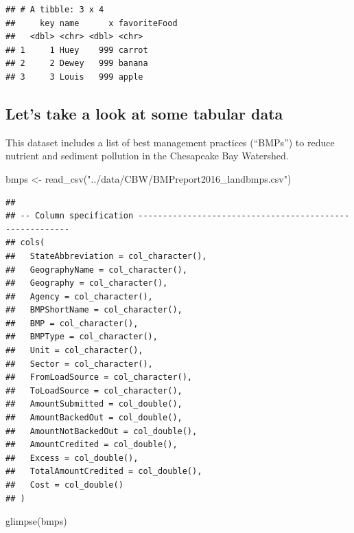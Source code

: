 \documentclass[]{article}
\newenvironment{Shaded}{\begin{snugshade}}{\end{snugshade}}
\newcommand{\FunctionTok}[1]{\textcolor[rgb]{0.00,0.00,0.00}{#1}}
\newcommand{\NormalTok}[1]{#1}
\newcommand{\OtherTok}[1]{\textcolor[rgb]{0.56,0.35,0.01}{#1}}
\newcommand{\StringTok}[1]{\textcolor[rgb]{0.31,0.60,0.02}{#1}}
\begin{document}
\begin{verbatim}
## # A tibble: 3 x 4
##     key name      x favoriteFood
##   <dbl> <chr> <dbl> <chr>       
## 1     1 Huey    999 carrot      
## 2     2 Dewey   999 banana      
## 3     3 Louis   999 apple
\end{verbatim}

\hypertarget{lets-take-a-look-at-some-tabular-data}{%
\subsection{Let's take a look at some tabular
data}\label{lets-take-a-look-at-some-tabular-data}}

This dataset includes a list of best management practices (``BMPs'') to
reduce nutrient and sediment pollution in the Chesapeake Bay Watershed.

\begin{Shaded}
\begin{Highlighting}[]
\NormalTok{bmps }\OtherTok{\textless{}{-}} \FunctionTok{read\_csv}\NormalTok{(}\StringTok{"../data/CBW/BMPreport2016\_landbmps.csv"}\NormalTok{)}
\end{Highlighting}
\end{Shaded}

\begin{verbatim}
## 
## -- Column specification --------------------------------------------------------
## cols(
##   StateAbbreviation = col_character(),
##   GeographyName = col_character(),
##   Geography = col_character(),
##   Agency = col_character(),
##   BMPShortName = col_character(),
##   BMP = col_character(),
##   BMPType = col_character(),
##   Unit = col_character(),
##   Sector = col_character(),
##   FromLoadSource = col_character(),
##   ToLoadSource = col_character(),
##   AmountSubmitted = col_double(),
##   AmountBackedOut = col_double(),
##   AmountNotBackedOut = col_double(),
##   AmountCredited = col_double(),
##   Excess = col_double(),
##   TotalAmountCredited = col_double(),
##   Cost = col_double()
## )
\end{verbatim}

\begin{Shaded}
\begin{Highlighting}[]
\FunctionTok{glimpse}\NormalTok{(bmps)}
\end{Highlighting}
\end{Shaded}
\end{document}
